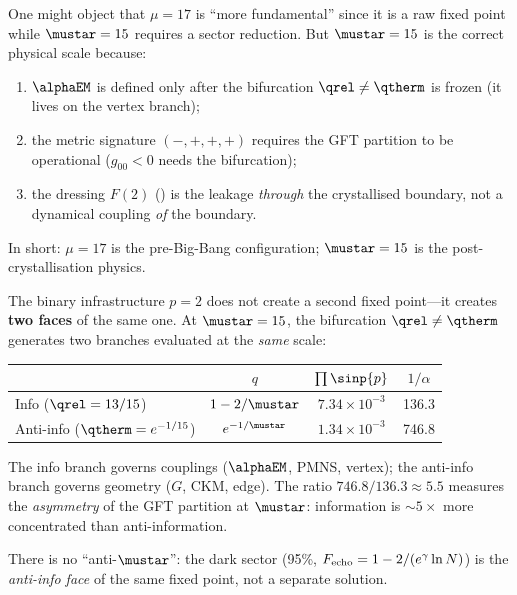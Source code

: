 \documentclass[12pt,a4paper]{article}
\begin{document}
\begin{remark}[Why $\mustar = 15$ is the physical fixed point]
\label{rem:why_15}
One might object that $\mu = 17$ is ``more fundamental'' since it is
a raw fixed point while $\mustar = 15$ requires a sector reduction.
But $\mustar = 15$ is the correct physical scale because:
\begin{enumerate}[nosep]
\item $\alphaEM$ is defined only after the bifurcation
  $\qrel \neq \qtherm$ is frozen (it lives on the vertex branch);
\item the metric signature $(-,+,+,+)$ requires the GFT partition
  to be operational ($g_{00} < 0$ needs the bifurcation);
\item the dressing $F(2)$ (\cite{companion_physics}) is the leakage
  \emph{through} the crystallised boundary, not a dynamical coupling
  \emph{of} the boundary.
\end{enumerate}
In short: $\mu = 17$ is the pre-Big-Bang configuration;
$\mustar = 15$ is the post-crystallisation physics.
\end{remark}

\begin{remark}[The two faces of $\mustar = 15$]
\label{rem:two_faces}
The binary infrastructure $p = 2$ does not create a second fixed
point---it creates \textbf{two faces} of the same one.
At $\mustar = 15$, the bifurcation $\qrel \neq \qtherm$
generates two branches evaluated at the \emph{same} scale:
\begin{center}
\begin{tabular}{lccc}
\toprule
& $q$ & $\prod \sinp{p}$ & $1/\alpha$ \\
\midrule
Info ($\qrel = 13/15$) & $1 - 2/\mustar$ & $7.34 \times 10^{-3}$ & 136.3 \\
Anti-info ($\qtherm = e^{-1/15}$) & $e^{-1/\mustar}$ & $1.34 \times 10^{-3}$ & 746.8 \\
\bottomrule
\end{tabular}
\end{center}
The info branch governs couplings ($\alphaEM$, PMNS, vertex);
the anti-info branch governs geometry ($G$, CKM, edge).
The ratio $746.8 / 136.3 \approx 5.5$ measures the
\emph{asymmetry} of the GFT partition at $\mustar$:
information is $\sim 5\times$ more concentrated than anti-information.

There is no ``anti-$\mustar$'': the dark sector (95\%,
$F_{\rm echo} = 1 - 2/(e^\gamma \ln N)$) is the
\emph{anti-info face} of the same fixed point, not a separate
solution.
\end{remark}
\end{document}
